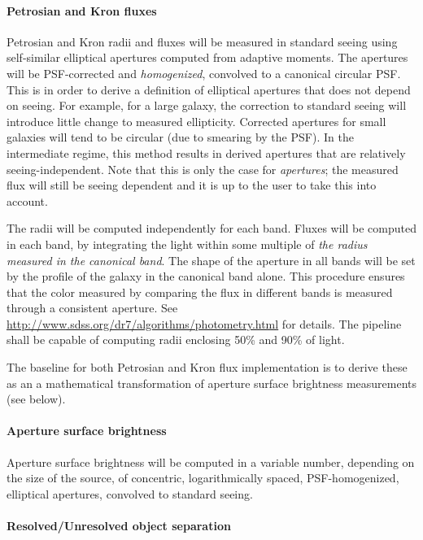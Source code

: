 \documentclass[12pt]{article}
\begin{document}
\paragraph{Petrosian and Kron fluxes} Petrosian and Kron radii and fluxes will be measured in standard seeing using self-similar elliptical apertures computed from adaptive moments. The apertures will be PSF-corrected and \emph{homogenized}, convolved to a canonical circular PSF\@. This is in order to derive a definition of elliptical apertures that does not depend on seeing. For example, for a large galaxy, the correction to standard seeing will introduce little change to measured ellipticity. Corrected apertures for small galaxies will tend to be circular (due to smearing by the PSF). In the intermediate regime, this method results in derived apertures that are relatively seeing-independent. Note that this is only the case for \emph{apertures}; the measured flux will still be seeing dependent and it is up to the user to take this into account.

The radii will be computed independently for each band. Fluxes will be computed in each band, by integrating the light within some multiple of \emph{the radius measured in the canonical band}. The shape of the aperture in all bands will be set by the profile of the galaxy in the canonical band alone. This procedure ensures that the color measured by comparing the flux in different bands is measured through a consistent aperture. See \url{http://www.sdss.org/dr7/algorithms/photometry.html} for details. The pipeline shall be capable of computing radii enclosing 50\% and 90\% of light.

The baseline for both Petrosian and Kron flux implementation is to derive these as an a mathematical transformation of aperture surface brightness measurements (see below).

\paragraph{Aperture surface brightness} Aperture surface brightness will be computed in a variable number, depending on the size of the source, of concentric, logarithmically spaced, PSF-homogenized, elliptical apertures, convolved to standard seeing.

\paragraph{Resolved/Unresolved object separation}
\label{alg:star-galaxy}
\end{document}
